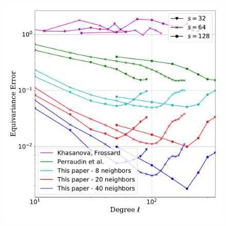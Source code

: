 \documentclass{article} %
\begin{document}
\begin{figure}

	\begin{minipage}{0.6\linewidth}
		\centering
		\includegraphics[width=1\linewidth]{all_in_one.pdf}


\end{minipage}
\end{figure}
\end{document}
